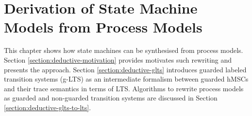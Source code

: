 \chapter{Derivation of State Machine Models from Process Models\label{chapter:deductive}}

This chapter shows how state machines can be synthesised from process models. Section \ref{section:deductive-motivation} provides motivates such rewriting and presents the approach. Section \ref{section:deductive-glts} introduces guarded labeled transition systems (g-LTS) as an intermediate formalism between guarded hMSCs and their trace semantics in terms of LTS. Algorithms to rewrite process models as guarded and non-guarded transition systems are discussed in Section \ref{section:deductive-glts-to-lts}.





